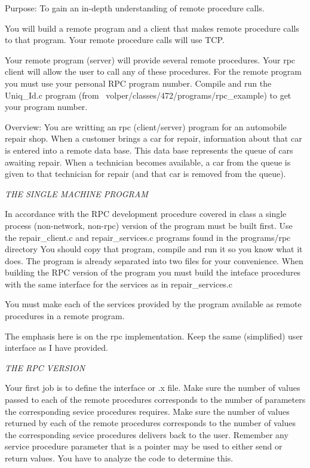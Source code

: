 

\parindent 0pt

Purpose: To gain an in-depth understanding of
remote procedure calls.

You will build a remote program and a client that makes remote procedure calls 
to that program.
Your remote procedure calls will use TCP.

Your remote program (server) will provide several remote procedures.
Your rpc client will allow the user to call any of these procedures.
For the remote program you must use your personal RPC program
number.
Compile and run the {\ltt{}Uniq_Id.c} program 
(from {\ltt{}~volper/classes/472/programs/rpc_example})
to get your program number.

Overview: You are writting an rpc (client/server) program for an automobile
repair shop. When a customer brings a car for repair, information about
that car is entered into a remote data base.
This data base represents the queue of cars awaiting repair. 
When a technician becomes available, a car from the queue is given to that 
technician for repair (and that car is removed from the queue).

{\it THE SINGLE MACHINE PROGRAM} 

In accordance with the RPC development procedure covered in class a
single process (non-network, non-rpc) version of the program must be
built first.
Use the {\ltt{}repair_client.c} and {\ltt{}repair_services.c} programs
found in the {\ltt{}programs/rpc} directory
You should copy that program, compile and run it so you know what it does.
The program is already separated into two files for your convenience.
When building the RPC version of the program you must
build the inteface procedures with the same interface
for the services as in {\ltt{}repair_services.c}

You must make each of the services provided by the program
available as remote procedures in a remote program.

The emphasis here is on the rpc implementation.
Keep the same (simplified) user interface as I have provided.

{\it THE RPC VERSION}

Your first job is to define the interface or {\ltt{}.x} file.
Make sure the number of values passed to each of the remote procedures
corresponds to the number of parameters the corresponding
sevice procedures requires.
Make sure the number of values returned by each of the remote procedures
corresponds to the number of values the corresponding
sevice procedures delivers back to the user.
Remember any service procedure parameter that is a pointer may be
used to either send or return values. You have to analyze the code
to determine this.


